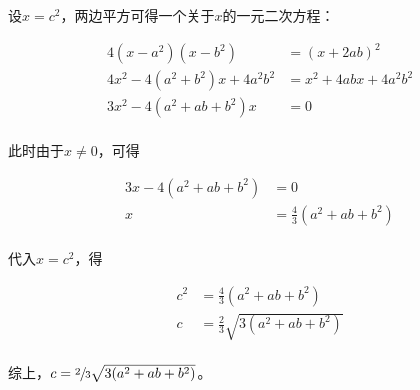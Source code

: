 设$x = c^2$，两边平方可得一个关于$x$的一元二次方程：

\begin{align*}
  4(x - a^2)(x - b^2) &= (x + 2ab)^2 \\
  4x^2 - 4(a^2 + b^2)x + 4a^2b^2 &= x^2 + 4abx + 4a^2b^2 \\
  3x^2 - 4(a^2 + ab + b^2)x &= 0 \\
\end{align*}

此时由于$x \ne0$，可得

\begin{align*}
  3x - 4(a^2 + ab + b^2) &= 0 \\
  x &= \frac43(a^2 + ab + b^2) \\
\end{align*}

代入$x = c^2$，得

\begin{align*}
  c^2 &= \frac43(a^2 + ab + b^2) \\
  c &= \frac23\sqrt{3(a^2 + ab + b^2)} \\
\end{align*}

综上，$c = \sfrac23\sqrt{3(a^2 + ab + b^2)}$。
